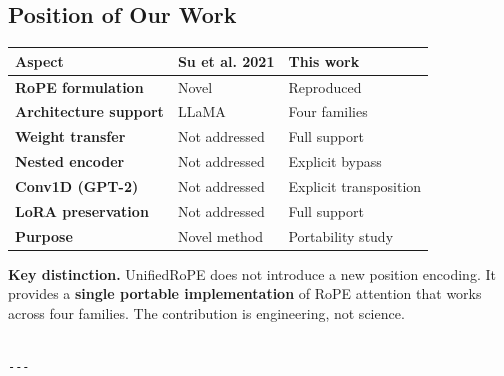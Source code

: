 \subsection{Position of Our Work}

\begin{table}[H]
\centering
\small
\begin{tabular}{lll}
\toprule
\textbf{Aspect} & \textbf{Su et al. 2021} & \textbf{This work} \\
\midrule
\textbf{RoPE formulation} & Novel & Reproduced \\
\textbf{Architecture support} & LLaMA & Four families \\
\textbf{Weight transfer} & Not addressed & Full support \\
\textbf{Nested encoder} & Not addressed & Explicit bypass \\
\textbf{Conv1D (GPT-2)} & Not addressed & Explicit transposition \\
\textbf{LoRA preservation} & Not addressed & Full support \\
\textbf{Purpose} & Novel method & Portability study \\
\bottomrule
\end{tabular}
\end{table}

\textbf{Key distinction.} UnifiedRoPE does not introduce a new position encoding. 
It provides a \textbf{single portable implementation} of RoPE attention that 
works across four families. The contribution is engineering, not science.
\begin{lstlisting}

---
\end{lstlisting}